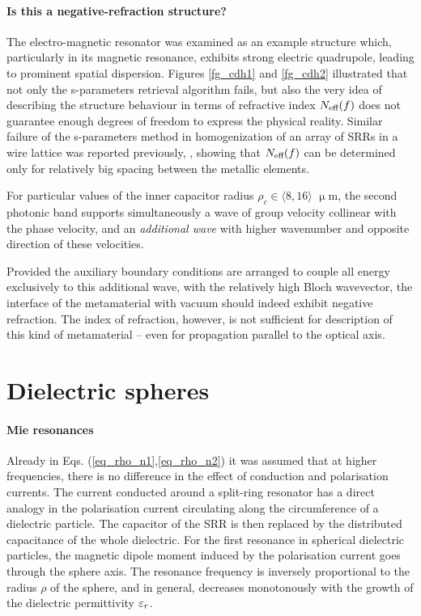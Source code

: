 \paragraph{Is this a negative-refraction structure?}%
The electro-magnetic resonator was examined as an example structure which, particularly in its magnetic resonance, exhibits strong electric quadrupole, leading to prominent spatial dispersion. Figures \ref{fg_cdh1} and \ref{fg_cdh2} illustrated that not only the s-parameters retrieval algorithm fails, but also the very idea of describing the structure behaviour in terms of refractive index $N_{\text{eff} }(f)$ does not guarantee enough degrees of freedom to express the physical reality.
Similar failure of the s-parameters method in homogenization of an array of SRRs in a wire lattice was reported previously, \cite{rockstuhl2008transition}, showing that $N_{\text{eff} }(f)$ can be determined only for relatively big spacing between the metallic  elements.

For particular values of the inner capacitor radius $\rho_c \in \langle8,16\rangle$ $\upmu$m, the second photonic band supports simultaneously a wave of group velocity collinear with the phase velocity, and an \textit{additional wave} with higher wavenumber and opposite direction of these velocities. 

Provided the auxiliary boundary conditions are arranged to couple all energy exclusively to this additional wave, with the relatively high Bloch wavevector, the interface of the metamaterial with vacuum should indeed exhibit negative refraction. The index of refraction, however, is not sufficient for description of this kind of metamaterial -- even for propagation parallel to the optical axis.

\FloatBarrier %
\section{Dielectric spheres} %
\paragraph{Mie resonances}%
Already in Eqs. (\ref{eq_rho_n1},\ref{eq_rho_n2}) it was assumed that at higher frequencies, there is no difference in the effect of conduction and polarisation currents. The current conducted around a split-ring resonator has a direct analogy in the polarisation current circulating along the circumference of a dielectric particle. The capacitor of the SRR is then replaced by the distributed capacitance of the whole dielectric. For the first resonance in spherical dielectric particles, the magnetic dipole moment induced by the polarisation current goes through the sphere axis. The resonance frequency is inversely proportional to the radius $\rho$ of the sphere, and in general, decreases monotonously with the growth of the dielectric permittivity $\varepsilon_r$.

